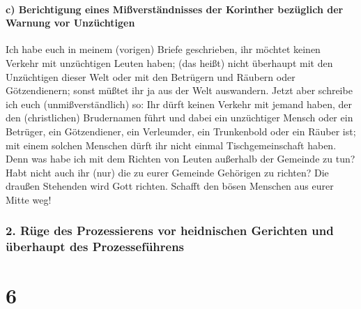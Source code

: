 \hypertarget{c-berichtigung-eines-miuxdfverstuxe4ndnisses-der-korinther-bezuxfcglich-der-warnung-vor-unzuxfcchtigen}{%
\paragraph{c) Berichtigung eines Mißverständnisses der Korinther
bezüglich der Warnung vor
Unzüchtigen}\label{c-berichtigung-eines-miuxdfverstuxe4ndnisses-der-korinther-bezuxfcglich-der-warnung-vor-unzuxfcchtigen}}

 Ich habe euch in meinem (vorigen) Briefe geschrieben, ihr
möchtet keinen Verkehr mit unzüchtigen Leuten haben; 
(das heißt) nicht überhaupt mit den Unzüchtigen dieser Welt oder mit den
Betrügern und Räubern oder Götzendienern; sonst müßtet ihr ja aus der
Welt auswandern.  Jetzt aber schreibe ich euch
(unmißverständlich) so: Ihr dürft keinen Verkehr mit jemand haben, der
den (christlichen) Brudernamen führt und dabei ein unzüchtiger Mensch
oder ein Betrüger, ein Götzendiener, ein Verleumder, ein Trunkenbold
oder ein Räuber ist; mit einem solchen Menschen dürft ihr nicht einmal
Tischgemeinschaft haben.  Denn was habe ich mit dem
Richten von Leuten außerhalb der Gemeinde zu tun? Habt nicht auch ihr
(nur) die zu eurer Gemeinde Gehörigen zu richten?  Die
draußen Stehenden wird Gott richten. Schafft den bösen Menschen aus
eurer Mitte weg!

\hypertarget{ruxfcge-des-prozessierens-vor-heidnischen-gerichten-und-uxfcberhaupt-des-prozessefuxfchrens}{%
\subsubsection{2. Rüge des Prozessierens vor heidnischen Gerichten und
überhaupt des
Prozesseführens}\label{ruxfcge-des-prozessierens-vor-heidnischen-gerichten-und-uxfcberhaupt-des-prozessefuxfchrens}}

\hypertarget{section-5}{%
\section{6}\label{section-5}}

